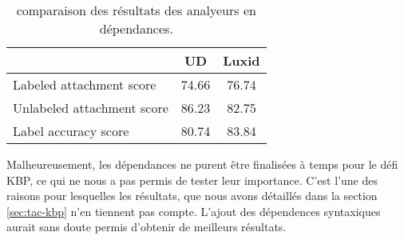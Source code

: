 \documentclass[PhD-Yoann-Dupont.tex]{subfiles}
\begin{document}
\begin{table}[ht!]
\centering
\begin{tabular}{|l|c|c|}
\cline{2-3}
\multicolumn{1}{l|}{}      & UD    & Luxid \\
\hline
Labeled attachment score   & 74.66 & 76.74 \\
Unlabeled attachment score & 86.23 & 82.75 \\
Label accuracy score       & 80.74 & 83.84 \\
\hline
\end{tabular}
\caption{comparaison des résultats des analyeurs en dépendances.}
\label{tab:dependencies-luxid-vs-UD}
\end{table}

Malheureusement, les dépendances ne purent être finalisées à temps pour le défi KBP, ce qui ne nous a pas permis de tester leur importance. C'est l'une des raisons pour lesquelles les résultats, que nous avons détaillés dans la section \ref{sec:tac-kbp} n'en tiennent pas compte. L'ajout des dépendences syntaxiques aurait sans doute permis d'obtenir de meilleurs résultats.
\end{document}
